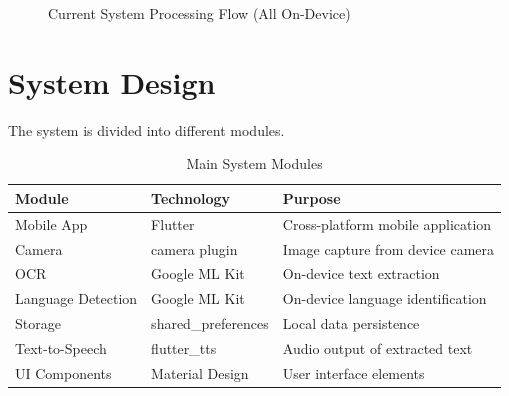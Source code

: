 \documentclass[12pt,a4paper]{report}
\begin{document}
\begin{figure}[H]
\centering

\caption{Current System Processing Flow (All On-Device)}
\end{figure}

\section{System Design}

The system is divided into different modules.

\begin{table}[H]
\centering
\caption{Main System Modules}
\begin{tabular}{|p{4cm}|p{4cm}|p{4cm}|}
\hline
\textbf{Module} & \textbf{Technology} & \textbf{Purpose} \\ \hline
Mobile App & Flutter & Cross-platform mobile application \\ \hline
Camera & camera plugin & Image capture from device camera \\ \hline
OCR & Google ML Kit & On-device text extraction \\ \hline
Language Detection & Google ML Kit & On-device language identification \\ \hline
Storage & shared\_preferences & Local data persistence \\ \hline
Text-to-Speech & flutter\_tts & Audio output of extracted text \\ \hline
UI Components & Material Design & User interface elements \\ \hline
\end{tabular}
\end{table}
\end{document}
